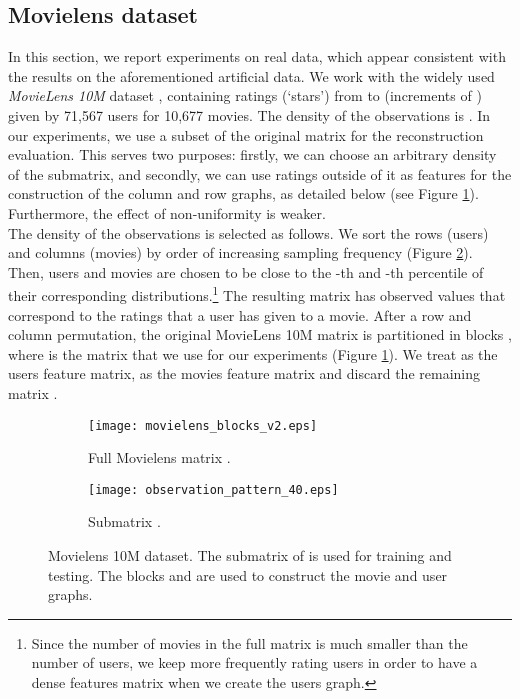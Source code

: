 \documentclass{article}
\begin{document}
\subsection{Movielens dataset}
\label{secNumExp}
\vspace{-0.25cm}
In this section, we report experiments on real data, which appear consistent with the results on the aforementioned artificial data. We work with the widely used \textit{MovieLens 10M} dataset \cite{pro:Miller03MovieLens}, containing ratings (`stars') from  to  (increments of ) given by 71,567 users for 10,677 movies. The density of the observations is . In our experiments, we use a  subset of the original matrix for the reconstruction evaluation. This serves two purposes: firstly, we can choose an arbitrary density of the submatrix, and secondly, we can use ratings outside of it as features for the construction of the column and row graphs, as detailed below (see Figure \ref{fig:movielens_blocks}). Furthermore, the effect of non-uniformity is weaker.\\
The density of the observations is selected as follows. We sort the rows (users) and columns (movies) by order of increasing sampling frequency (Figure \ref{fig:part_movielens}). Then, users and movies are chosen to be close to the -th and -th percentile of their corresponding distributions.\footnote{Since the number of movies in the full matrix is much smaller than the number of users, we keep more frequently rating users in order to have a dense features matrix when we create the users graph.} The resulting  matrix has  observed values  that correspond to the ratings that a user has given to a movie.
After a row and column permutation, the original MovieLens 10M matrix  is partitioned in blocks , where  is the  matrix that we use for our experiments (Figure \ref{fig:movielens_blocks}). We treat  as the users feature matrix,  as the movies feature matrix and discard the remaining matrix .
\begin{figure}
        \begin{subfigure}[b]{.5\linewidth}
\centering \texttt{[image: movielens\_blocks\_v2.eps]}
	\vspace{-0.25cm}
            \vspace{0.65cm}
            \caption{Full Movielens matrix .}\label{fig:movielens_blocks}
	\vspace{-0.15cm}
          \end{subfigure}
          \begin{subfigure}[b]{.5\linewidth}
            \centering\texttt{[image: observation\_pattern\_40.eps]}
	\vspace{-0.2cm}
            \caption{Submatrix .}\label{fig:part_movielens}
	\vspace{-0.15cm}
          \end{subfigure}
          \caption{Movielens 10M dataset. The submatrix  of  is used for training and testing. The blocks  and  are used to construct the movie and user graphs.}\label{fig:movielens}
	\vspace{-0.25cm}
\end{figure}
\end{document}

